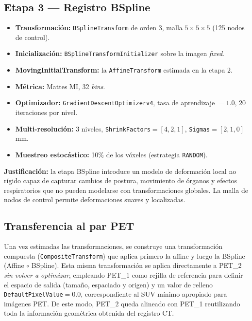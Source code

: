 \documentclass[12pt, letterpaper]{article}
\begin{document}
\subsection{Etapa 3 — Registro BSpline}
\begin{itemize}
    \item \textbf{Transformación:} \texttt{BSplineTransform} de orden 3, malla
    $5\times5\times5$ (125 nodos de control).
    \item \textbf{Inicialización:} \texttt{BSplineTransformInitializer} sobre la
    imagen \textit{fixed}.
    \item \textbf{MovingInitialTransform:} la \texttt{AffineTransform} estimada
    en la etapa 2.
    \item \textbf{Métrica:} Mattes MI, 32 \textit{bins}.
    \item \textbf{Optimizador:} \texttt{GradientDescentOptimizerv4}, tasa de
    aprendizaje $=1.0$, 20 iteraciones por nivel.
    \item \textbf{Multi-resolución:} 3 niveles, \texttt{ShrinkFactors}$=[4,2,1]$,
    \texttt{Sigmas}$=[2,1,0]$ mm.
    \item \textbf{Muestreo estocástico:} 10\% de los vóxeles (estrategia
    \texttt{RANDOM}).
\end{itemize}
\textbf{Justificación:} la etapa BSpline introduce un modelo de deformación local
no rígido capaz de capturar cambios de postura, movimiento de órganos y efectos
respiratorios que no pueden modelarse con transformaciones globales. La malla de
nodos de control permite deformaciones suaves y localizadas.

\subsection{Transferencia al par PET}
Una vez estimadas las transformaciones, se construye una transformación compuesta
(\texttt{CompositeTransform}) que aplica primero la affine y luego la BSpline
(Affine $\circ$ BSpline). Esta misma transformación se aplica directamente a
PET\_2 \emph{sin volver a optimizar}, empleando PET\_1 como rejilla de referencia
para definir el espacio de salida (tamaño, espaciado y origen) y un valor de
relleno \texttt{DefaultPixelValue}$=0.0$, correspondiente al SUV mínimo apropiado
para imágenes PET. De este modo, PET\_2 queda alineado con PET\_1 reutilizando
toda la información geométrica obtenida del registro CT.
\end{document}

